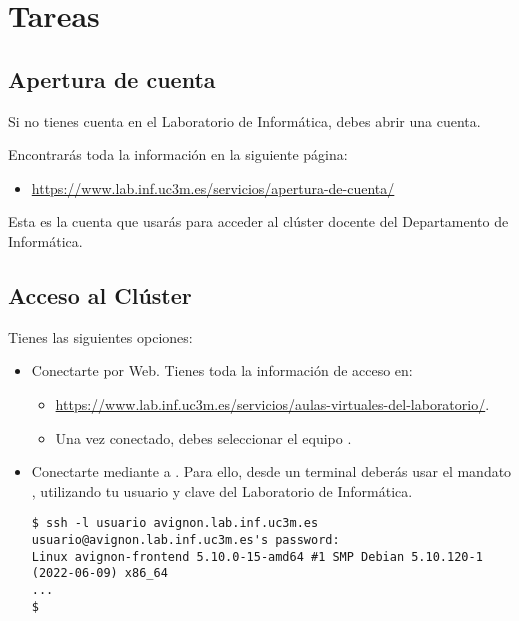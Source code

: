 \section{Tareas}

\subsection{Apertura de cuenta}

Si no tienes cuenta en el Laboratorio de Informática, debes abrir una cuenta.

Encontrarás toda la información en la siguiente página:

\begin{itemize}
  \item \url{https://www.lab.inf.uc3m.es/servicios/apertura-de-cuenta/}
\end{itemize}

Esta es la cuenta que usarás para acceder al clúster docente del Departamento de Informática.

\subsection{Acceso al Clúster}

Tienes las siguientes opciones:


\begin{itemize}
  \item Conectarte por Web. Tienes toda la información de acceso en:
    \begin{itemize}
      \item \url{https://www.lab.inf.uc3m.es/servicios/aulas-virtuales-del-laboratorio/}.
      \item Una vez conectado, debes seleccionar el equipo .
    \end{itemize}

  \item Conectarte mediante  a . Para ello,
        desde un terminal deberás usar el mandato , utilizando tu
        usuario y clave del Laboratorio de Informática.
\begin{lstlisting}[style=terminal]
$ ssh -l usuario avignon.lab.inf.uc3m.es
usuario@avignon.lab.inf.uc3m.es's password: 
Linux avignon-frontend 5.10.0-15-amd64 #1 SMP Debian 5.10.120-1 (2022-06-09) x86_64
...
$
\end{lstlisting}

\end{itemize}

